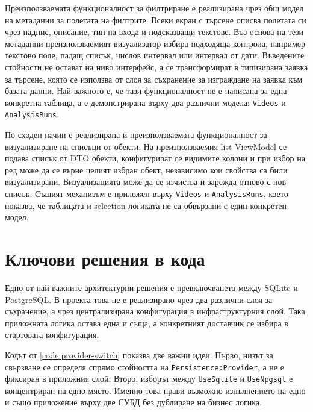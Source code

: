 Преизползваемата функционалност за филтриране е реализирана чрез общ модел на метаданни за полетата на филтрите. Всеки екран с търсене описва полетата си чрез надпис, описание, тип на входа и подсказващи текстове. Въз основа на тези метаданни преизползваемият визуализатор избира подходяща контрола, например текстово поле, падащ списък, числов интервал или интервал от дати. Въведените стойности не остават на ниво интерфейс, а се трансформират в типизирана заявка за търсене, която се използва от слоя за съхранение за изграждане на заявка към базата данни. Най-важното е, че тази функционалност не е написана за една конкретна таблица, а е демонстрирана върху два различни модела: \texttt{Videos} и \texttt{AnalysisRuns}.

По сходен начин е реализирана и преизползваемата функционалност за визуализиране на списъци от обекти. На преизползваемия list ViewModel се подава списък от DTO обекти, конфигурират се видимите колони и при избор на ред може да се върне целият избран обект, независимо кои свойства са били визуализирани. Визуализацията може да се изчиства и зарежда отново с нов списък. Същият механизъм е приложен върху \texttt{Videos} и \texttt{AnalysisRuns}, което показва, че таблицата и selection логиката не са обвързани с един конкретен модел.

\section{Ключови решения в кода}

Едно от най-важните архитектурни решения е превключването между SQLite и PostgreSQL. В проекта това не е реализирано чрез два различни слоя за съхранение, а чрез централизирана конфигурация в инфраструктурния слой. Така приложната логика остава една и съща, а конкретният доставчик се избира в стартовата конфигурация.



Кодът от \cref{code:provider-switch} показва две важни идеи. Първо, низът за свързване се определя спрямо стойността на \texttt{Persistence:Provider}, а не е фиксиран в приложния слой. Второ, изборът между \texttt{UseSqlite} и \texttt{UseNpgsql} е концентриран на едно място. Именно това прави възможно изпълнението на едно и също приложение върху две СУБД без дублиране на бизнес логика.

